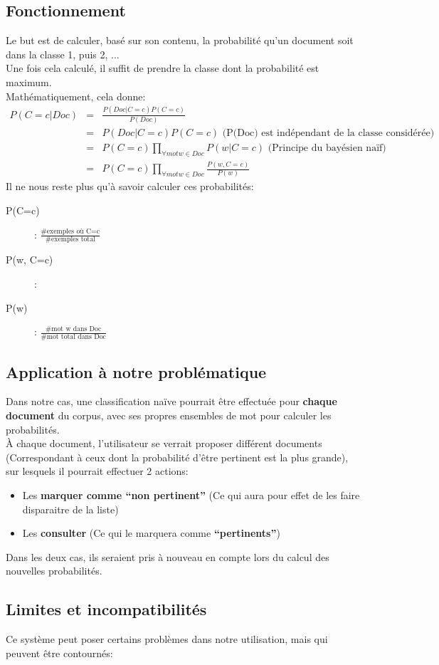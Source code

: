         \subsection{Fonctionnement}
            Le but est de calculer, basé sur son contenu, la probabilité qu'un document soit dans la classe 1, puis 2, ...\\
            Une fois cela calculé, il suffit de prendre la classe dont la probabilité est maximum.\\
            Mathématiquement, cela donne:
            \[
                \begin{array}{rcl}
                    P(C=c|Doc) &=& \frac{P(Doc|C=c)P(C=c)}{P(Doc)}\\
                    &=& P(Doc|C=c)P(C=c) \text{ (P(Doc) est indépendant de la classe considérée)} \\
                    &=& P(C=c)\prod_{\forall mot w\in Doc}P(w|C=c)\text{ (Principe du bayésien naïf)}\\
                    &=& P(C=c)\prod_{\forall mot w\in Doc}\frac{P(w, C=c)}{P(w)}
                \end{array}
            \]
            Il ne nous reste plus qu'à savoir calculer ces probabilités:
            \begin{description}
                \item[P(C=c)]: $\frac{\text{\# exemples où C=c}}{\text{\# exemples total}}$
                \item[P(w, C=c)]:  $\frac{\text{}}{\text{}}$%
                \item[P(w)]: $\frac{\text{\# mot w dans Doc}}{\text{\# mot total dans Doc}}$
            \end{description}
        \subsection{Application à notre problématique}
            Dans notre cas, une classification naïve pourrait être effectuée pour \textbf{chaque document} du corpus, avec ses propres ensembles de mot pour calculer les probabilités.\\
            À chaque document, l'utilisateur se verrait proposer différent documents (Correspondant à ceux dont la probabilité d'être pertinent est la plus grande), sur lesquels il pourrait effectuer 2 actions:
            \begin{itemize}
                \item Les \textbf{marquer comme ``non pertinent''} (Ce qui aura pour effet de les faire disparaitre de la liste)
                \item Les \textbf{consulter} (Ce qui le marquera comme \textbf{``pertinents''})
            \end{itemize}
            Dans les deux cas, ils seraient pris à nouveau en compte lors du calcul des nouvelles probabilités.
        \subsection{Limites et incompatibilités}
            Ce système peut poser certains problèmes dans notre utilisation, mais qui peuvent être contournés:
